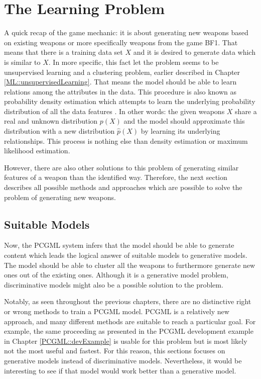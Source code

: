 \documentclass[MGS,Master,english]{twbook}%
\begin{document}
\section{The Learning Problem}
A quick recap of the game mechanic: it is about generating new weapons based on existing weapons or more specifically weapons from the game \ac{BF1}. That means that there is a training data set $X$ and it is desired to generate data which is similar to $X$. In more specific, this fact let the problem seems to be unsupervised learning and a clustering problem, earlier described in Chapter \ref{ML::unsupervisedLearning}. That means the model should be able to learn relations among the attributes in the data. This procedure is also known as probability density estimation which attempts to learn the underlying probability distribution of all the data features \cite{ml::vae::tutorial}. In other words: the given weapons $X$ share a real and unknown distribution $p(X)$ and the model should approximate this distribution with a new distribution $\hat{p}(X)$ by learning its underlying relationships. This process is nothing else than density estimation or maximum likelihood estimation. 

However, there are also other solutions to this problem of generating similar features of a weapon than the identified way. Therefore, the next section describes all possible methods and approaches which are possible to solve the problem of generating new weapons.

\subsection{Suitable Models}
Now, the PCGML system infers that the model should be able to generate content which leads the logical answer of suitable models to generative models. The model should be able to cluster all the weapons to furthermore generate new ones out of the existing ones. Although it is a generative model problem, discriminative models might also be a possible solution to the problem.

Notably, as seen throughout the previous chapters, there are no distinctive right or wrong methods to train a PCGML model. PCGML is a relatively new approach, and many different methods are suitable to reach a particular goal. For example, the same proceeding as presented in the PCGML development example in Chapter \ref{PCGML::devExample} is usable for this problem but is most likely not the most useful and fastest. For this reason, this sections focuses on generative models instead of discriminative models. Nevertheless, it would be interesting to see if that model would work better than a generative model. 
\end{document}
